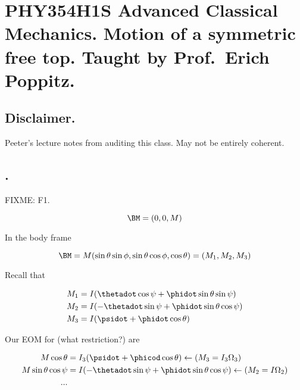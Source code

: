 
%

\chapter{PHY354H1S Advanced Classical Mechanics.  Motion of a symmetric free top.  Taught by Prof.\ Erich Poppitz.}
\label{chap:motionOfFreeTop}
{}
\date{Mar 28, 2012}

\beginArtWithToc

\section{Disclaimer.}

Peeter's lecture notes from auditing this class.  May not be entirely coherent.

\section{.}

FIXME: F1.

\begin{equation}\label{eqn:motionOfFreeTop:n}
\BM = (0, 0, M)
\end{equation}

In the body frame

\begin{equation}\label{eqn:motionOfFreeTop:n}
\BM = M ( \sin\theta \sin\phi, \sin\theta \cos\phi, \cos\theta ) = (M_1, M_2, M_3) 
\end{equation}

Recall that 

\begin{align}\label{eqn:motionOfFreeTop:n}
M_1 &= I (\thetadot \cos\psi + \phidot \sin\theta \sin\psi) \\
M_2 &= I (-\thetadot \sin\psi + \phidot \sin\theta \cos\psi) \\
M_3 &= I (\psidot + \phidot \cos\theta)
\end{align}

Our EOM for (what restriction?) are

\begin{align}\label{eqn:motionOfFreeTop:n}
M \cos\theta &= I_3 ( \psidot + \phicod \cos\theta ) \leftarrow ( M_3 = I_3 \Omega_3) \\
M \sin\theta \cos\psi &= I ( -\thetadot \sin\psi + \phidot \sin\theta \cos\psi)  \leftarrow (M_2 = I \Omega_2) \\
...
\end{align}


